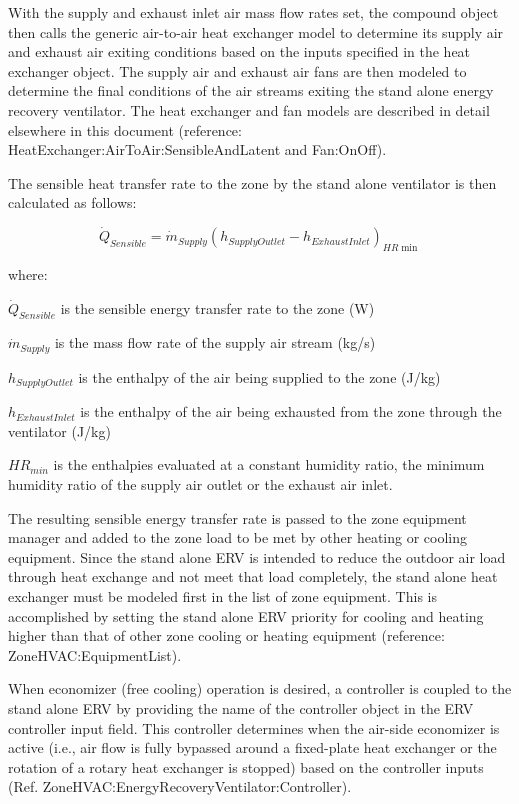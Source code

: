 With the supply and exhaust inlet air mass flow rates set, the compound object then calls the generic air-to-air heat exchanger model to determine its supply air and exhaust air exiting conditions based on the inputs specified in the heat exchanger object. The supply air and exhaust air fans are then modeled to determine the final conditions of the air streams exiting the stand alone energy recovery ventilator. The heat exchanger and fan models are described in detail elsewhere in this document (reference: HeatExchanger:AirToAir:SensibleAndLatent and Fan:OnOff).

The sensible heat transfer rate to the zone by the stand alone ventilator is then calculated as follows:

\begin{equation}
  \dot{Q}_{Sensible} = \dot{m}_{Supply} \left( h_{SupplyOutlet} - h_{ExhaustInlet} \right)_{HR\min }
\end{equation}

where:

\(\dot{Q}_{Sensible}\) is the sensible energy transfer rate to the zone (W)

\(\dot{m}_{Supply}\) is the mass flow rate of the supply air stream (kg/s)

\(h_{SupplyOutlet}\) is the enthalpy of the air being supplied to the zone (J/kg)

\(h_{ExhaustInlet}\) is the enthalpy of the air being exhausted from the zone through the ventilator (J/kg)

\(HR_{min}\) is the enthalpies evaluated at a constant humidity ratio, the minimum humidity ratio of the supply air outlet or the exhaust air inlet.

The resulting sensible energy transfer rate is passed to the zone equipment manager and added to the zone load to be met by other heating or cooling equipment. Since the stand alone ERV is intended to reduce the outdoor air load through heat exchange and not meet that load completely, the stand alone heat exchanger must be modeled first in the list of zone equipment. This is accomplished by setting the stand alone ERV priority for cooling and heating higher than that of other zone cooling or heating equipment (reference: ZoneHVAC:EquipmentList).

When economizer (free cooling) operation is desired, a controller is coupled to the stand alone ERV by providing the name of the controller object in the ERV controller input field. This controller determines when the air-side economizer is active (i.e., air flow is fully bypassed around a fixed-plate heat exchanger or the rotation of a rotary heat exchanger is stopped) based on the controller inputs (Ref. ZoneHVAC:EnergyRecoveryVentilator:Controller).

